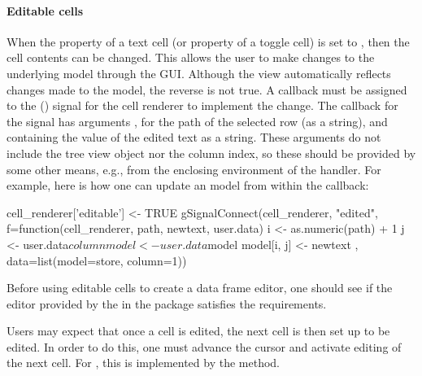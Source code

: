 \paragraph{Editable cells} When the  property of a text
cell (or  property of a toggle cell) is set to
, then the cell contents can be changed. This allows the
user to make changes to the underlying model through the GUI. Although
the view automatically reflects changes made to the model, the reverse
is not true. A callback must be assigned to the 
() signal for the cell renderer to implement the
change. The callback for the  signal has arguments
,  for the path of the selected row (as a
string), and  containing the value of the edited text
as a string. These arguments do not include the tree view object nor
the column index, so these should be provided by some other means,
e.g., from the enclosing environment of the handler.
For example, here is how one can update an  model
from within the callback:
\begin{Schunk}
\begin{Sinput}
 cell_renderer['editable'] <- TRUE
 gSignalConnect(cell_renderer, "edited", 
        f=function(cell_renderer, path, newtext, user.data) {
          i <- as.numeric(path) + 1
          j <- user.data$column
          model <- user.data$model
          model[i, j] <- newtext
        }, data=list(model=store, column=1))
\end{Sinput}
\end{Schunk}
% 
Before using editable cells to create a data frame editor, one should
see if the editor provided by the  in the
 package satisfies the requirements.

Users may expect that once a cell is edited, the next cell is then set
up to be edited. In order to do this, one must advance the cursor and
activate editing of the next cell. For , this is
implemented by the  method.

